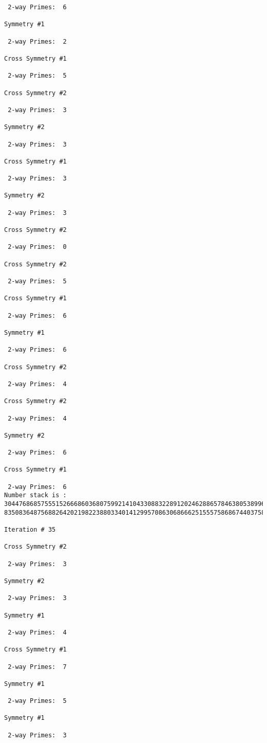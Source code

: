 {{{{\begin{verbatim}
 2-way Primes: 	6

Symmetry #1

 2-way Primes: 	2

Cross Symmetry #1

 2-way Primes: 	5

Cross Symmetry #2

 2-way Primes: 	3

Symmetry #2

 2-way Primes: 	3

Cross Symmetry #1

 2-way Primes: 	3

Symmetry #2

 2-way Primes: 	3

Cross Symmetry #2

 2-way Primes: 	0

Cross Symmetry #2

 2-way Primes: 	5

Cross Symmetry #1

 2-way Primes: 	6

Symmetry #1

 2-way Primes: 	6

Cross Symmetry #2

 2-way Primes: 	4

Cross Symmetry #2

 2-way Primes: 	4

Symmetry #2

 2-way Primes: 	6

Cross Symmetry #1

 2-way Primes: 	6
Number stack is :
30447686857555152666860368075992141043308832289120246288657846380538996794608835958544046240163340857
83508364875688264202198223880334014129957086306866625155575868674403758043361042640445859538806497699

Iteration #	35

Cross Symmetry #2

 2-way Primes: 	3

Symmetry #2

 2-way Primes: 	3

Symmetry #1

 2-way Primes: 	4

Cross Symmetry #1

 2-way Primes: 	7

Symmetry #1

 2-way Primes: 	5

Symmetry #1

 2-way Primes: 	3


\end{verbatim}}}}}
